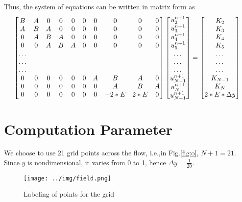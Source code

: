 Thus, the system of equations can be written in matrix form as
\begin{equation}
\begin{bmatrix}
            B & A & 0 & 0 & 0 & 0 & 0 & 0 & 0 & 0\\
            A & B & A & 0 & 0 & 0 & 0 & 0 & 0 & 0\\
            0 & A & B & A & 0 & 0 & 0 & 0 & 0 & 0\\
            0 & 0 & A & B & A & 0 & 0 & 0 & 0 & 0\\
            \dots \\
            \dots \\
            \dots \\
            0 & 0 & 0 & 0 & 0 & 0 & A & B & A & 0\\
            0 & 0 & 0 & 0 & 0 & 0 & 0 & A & B & A\\
            0 & 0 & 0 & 0 & 0 & 0 & 0 & -2*E & 2*E & 0
\end{bmatrix}
\begin{bmatrix}
u^{n+1}_2 \\
u^{n+1}_3 \\
u^{n+1}_4 \\
u^{n+1}_5 \\
$\dots$ \\
$\dots$ \\
$\dots$ \\
u^{n+1}_{N-1} \\
u^{n+1}_N \\
u^{n+1}_{N+1}
\end{bmatrix}
=
\begin{bmatrix}
K_2 \\
K_3 \\
K_4 \\
K_5 \\
$\dots$ \\
$\dots$ \\
$\dots$ \\
K_{N-1} \\
K_N \\
2*E*\Delta y\\
\end{bmatrix}
 \label{006}
\end{equation}

\section{Computation Parameter}
We choose to use 21 grid points across the flow, i.e.,in Fig.\eqref{fig:o}, $N+1=21$. Since $y$ is nondimensional, it varies from 0 to 1, hence $\Delta y = \frac{1}{20}$.
\begin{figure}[h]
\small
\centering
\texttt{[image: ../img/field.png]}
\caption{Labeling of points for the grid} \label{fig:o}
\end{figure}

